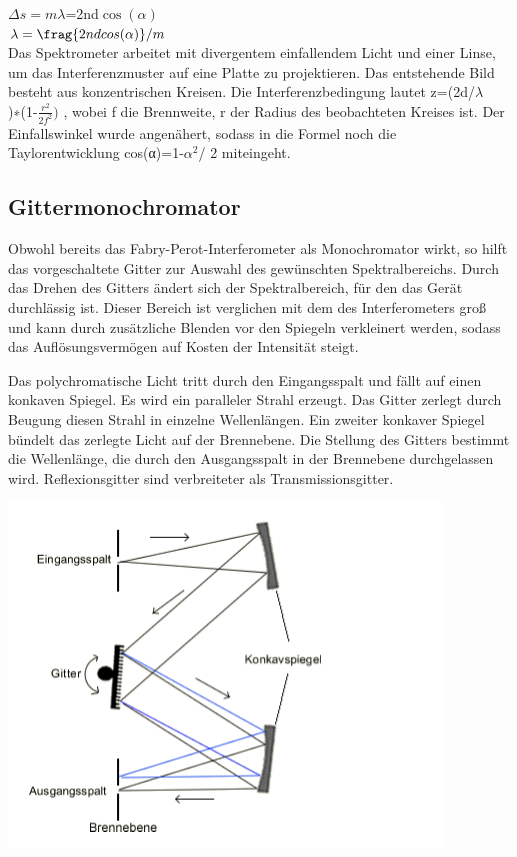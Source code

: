 \documentclass[10pt,a4paper]{article}
\begin{document}
$\Delta s=m\lambda$=2nd$\cos(\alpha)$\\

$\lambda= \frag{2ndcos(\alpha)}/ {m} $\\

Das Spektrometer arbeitet mit divergentem einfallendem Licht und einer Linse, um das Interferenzmuster auf eine Platte zu projektieren. Das entstehende Bild besteht aus konzentrischen Kreisen. Die Interferenzbedingung lautet z=(2d/$\lambda$ )∗(1-$\frac{r^2} {2f^2} )$ , wobei f die Brennweite, r der Radius des beobachteten Kreises ist. Der Einfallswinkel wurde angenähert, sodass in die Formel noch die Taylorentwicklung cos(α)=1-$\alpha^2$/ 2 miteingeht.

\subsection{ Gittermonochromator}

Obwohl bereits das Fabry-Perot-Interferometer als Monochromator wirkt, so hilft das vorgeschaltete Gitter zur Auswahl des gewünschten Spektralbereichs. Durch das Drehen des Gitters ändert sich der Spektralbereich, für den das Gerät durchlässig ist. Dieser Bereich ist verglichen mit dem des Interferometers groß und kann durch zusätzliche Blenden vor den Spiegeln verkleinert werden, sodass das Auflösungsvermögen auf Kosten der Intensität steigt. 

Das polychromatische Licht tritt durch den Eingangsspalt und fällt auf einen konkaven Spiegel. Es wird ein paralleler Strahl erzeugt. Das Gitter zerlegt durch Beugung diesen Strahl in einzelne Wellenlängen. Ein zweiter konkaver Spiegel bündelt das zerlegte Licht auf der Brennebene. Die Stellung des Gitters bestimmt die Wellenlänge, die durch den Ausgangsspalt in der Brennebene durchgelassen wird. Reflexionsgitter sind verbreiteter als Transmissionsgitter.

\includegraphics{gitter}
\end{document}
